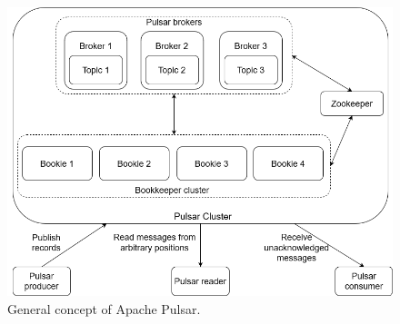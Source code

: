 \begin{figure}[h]
	\centering
	\includegraphics[width=12cm]{images/general-pulsar.png}
	\caption{General concept of Apache Pulsar.}
	\label{fig:pulsargeneral}
\end{figure}

